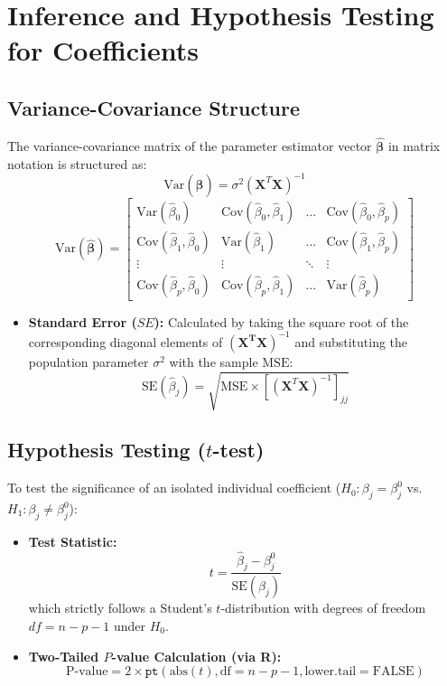 \documentclass{article}
\begin{document}
\newpage
\section{Inference and Hypothesis Testing for Coefficients}

\subsection{Variance-Covariance Structure}
The variance-covariance matrix of the parameter estimator vector $\mathbf{\hat{\beta}}$ in matrix notation is structured as:
$$\text{Var}(\hat{\boldsymbol{\beta}}) = \sigma^2(\mathbf{X}^T\mathbf{X})^{-1}$$
$$\text{Var}(\mathbf{\hat{\beta}}) = \begin{bmatrix} \text{Var}(\hat{\beta}_0) & \text{Cov}(\hat{\beta}_0, \hat{\beta}_1) & \dots & \text{Cov}(\hat{\beta}_0, \hat{\beta}_p) \\ \text{Cov}(\hat{\beta}_1, \hat{\beta}_0) & \text{Var}(\hat{\beta}_1) & \dots & \text{Cov}(\hat{\beta}_1, \hat{\beta}_p) \\ \vdots & \vdots & \ddots & \vdots \\ \text{Cov}(\hat{\beta}_p, \hat{\beta}_0) & \text{Cov}(\hat{\beta}_p, \hat{\beta}_1) & \dots & \text{Var}(\hat{\beta}_p) \end{bmatrix}$$

\begin{itemize}
    \item \textbf{Standard Error ($SE$):} Calculated by taking the square root of the corresponding diagonal elements of $(\mathbf{X^TX})^{-1}$ and substituting the population parameter $\sigma^2$ with the sample $\text{MSE}$:
    $$\text{SE}(\hat{\beta}_j) = \sqrt{\text{MSE} \times \left[(\mathbf{X}^T\mathbf{X})^{-1}\right]_{jj}}$$
\end{itemize}

\subsection{Hypothesis Testing ($t$-test)}
To test the significance of an isolated individual coefficient ($H_0: \beta_j = \beta_j^0$ vs. $H_1: \beta_j \neq \beta_j^0$):
\begin{itemize}
    \item \textbf{Test Statistic:}
    $$t = \frac{\hat{\beta}_j - \beta_j^0}{\text{SE}(\hat{\beta}_j)}$$
    which strictly follows a Student's $t$-distribution with degrees of freedom $df = n - p - 1$ under $H_0$.
    \item \textbf{Two-Tailed $P$-value Calculation (via R):}
    $$\text{P-value} = 2 \times \texttt{pt}(\text{abs}(t), \text{df} = n - p - 1, \text{lower.tail} = \text{FALSE})$$
\end{itemize}
\end{document}
